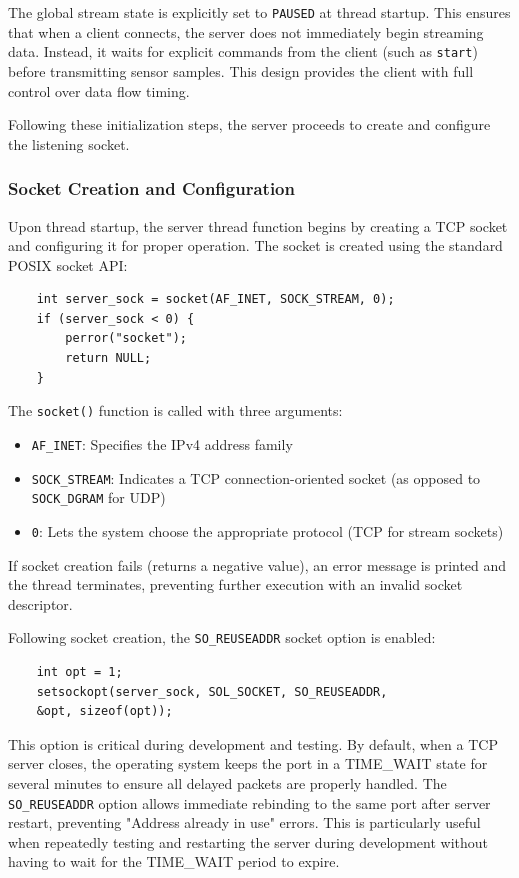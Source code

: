 The global stream state is explicitly set to \texttt{PAUSED} at thread startup. This ensures that when a client connects, the server does not immediately begin streaming data. Instead, it waits for explicit commands from the client (such as \texttt{start}) before transmitting sensor samples. This design provides the client with full control over data flow timing.

Following these initialization steps, the server proceeds to create and configure the listening socket.

\subsubsection{Socket Creation and Configuration}
Upon thread startup, the server thread function begins by creating a TCP socket and configuring it for proper operation. The socket is created using the standard POSIX socket API:

\begin{verbatim}
	int server_sock = socket(AF_INET, SOCK_STREAM, 0);
	if (server_sock < 0) { 
		perror("socket"); 
		return NULL; 
	}
\end{verbatim}
The \texttt{socket()} function is called with three arguments:
\begin{itemize}
	\item \texttt{AF\_INET}: Specifies the IPv4 address family
	\item \texttt{SOCK\_STREAM}: Indicates a TCP connection-oriented socket (as opposed to \texttt{SOCK\_DGRAM} for UDP)
	\item \texttt{0}: Lets the system choose the appropriate protocol (TCP for stream sockets)
\end{itemize}

If socket creation fails (returns a negative value), an error message is printed and the thread terminates, preventing further execution with an invalid socket descriptor.

Following socket creation, the \texttt{SO\_REUSEADDR} socket option is enabled:

\begin{verbatim}
	int opt = 1;
	setsockopt(server_sock, SOL_SOCKET, SO_REUSEADDR, 
	&opt, sizeof(opt));
\end{verbatim}

This option is critical during development and testing. By default, when a TCP server closes, the operating system keeps the port in a TIME\_WAIT state for several minutes to ensure all delayed packets are properly handled. The \texttt{SO\_REUSEADDR} option allows immediate rebinding to the same port after server restart, preventing "Address already in use" errors. This is particularly useful when repeatedly testing and restarting the server during development without having to wait for the TIME\_WAIT period to expire.


